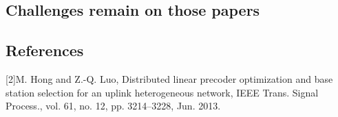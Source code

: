 \documentclass[paper=a4paper,12pt]{article}
\begin{document}
\subsection{Challenges remain on those papers}
\subsection{References}
[2]\quad M. Hong and Z.-Q. Luo, Distributed linear precoder optimization and base station selection for an uplink heterogeneous network, IEEE Trans. Signal Process., vol. 61, no. 12, pp. 3214–3228, Jun. 2013.
\end{document}
